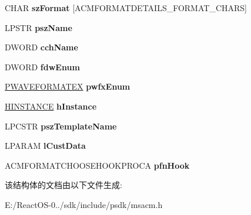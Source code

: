 \begin{DoxyCompactItemize}
\item 
\mbox{\label{struct___a_c_m_f_o_r_m_a_t_c_h_o_o_s_e_a_aa12541afbdb2ce4ba2170921fbbb7c5f}} 
C\+H\+AR {\bfseries sz\+Format} \mbox{[}A\+C\+M\+F\+O\+R\+M\+A\+T\+D\+E\+T\+A\+I\+L\+S\+\_\+\+F\+O\+R\+M\+A\+T\+\_\+\+C\+H\+A\+RS\mbox{]}
\item 
\mbox{\label{struct___a_c_m_f_o_r_m_a_t_c_h_o_o_s_e_a_a413c774e03db9ddd96c7baf54e897425}} 
L\+P\+S\+TR {\bfseries psz\+Name}
\item 
\mbox{\label{struct___a_c_m_f_o_r_m_a_t_c_h_o_o_s_e_a_a2a01ecd4c89bd2b08129a4c9c00c91ac}} 
D\+W\+O\+RD {\bfseries cch\+Name}
\item 
\mbox{\label{struct___a_c_m_f_o_r_m_a_t_c_h_o_o_s_e_a_aa82ee8884256f606da432f2aa06a5779}} 
D\+W\+O\+RD {\bfseries fdw\+Enum}
\item 
\mbox{\label{struct___a_c_m_f_o_r_m_a_t_c_h_o_o_s_e_a_a754fb60042efdbc527571146f68d3afb}} 
\hyperlink{struct___w_a_v_e_f_o_r_m_a_t_e_x}{P\+W\+A\+V\+E\+F\+O\+R\+M\+A\+T\+EX} {\bfseries pwfx\+Enum}
\item 
\mbox{\label{struct___a_c_m_f_o_r_m_a_t_c_h_o_o_s_e_a_a0fd60620a53ba2e738e99b49fa3f7f32}} 
\hyperlink{interfacevoid}{H\+I\+N\+S\+T\+A\+N\+CE} {\bfseries h\+Instance}
\item 
\mbox{\label{struct___a_c_m_f_o_r_m_a_t_c_h_o_o_s_e_a_a57d8dae1e0bf242f1dcc72e371a3e5e8}} 
L\+P\+C\+S\+TR {\bfseries psz\+Template\+Name}
\item 
\mbox{\label{struct___a_c_m_f_o_r_m_a_t_c_h_o_o_s_e_a_ab8322f8a8e9e24a9fd0f6c7cda7333df}} 
L\+P\+A\+R\+AM {\bfseries l\+Cust\+Data}
\item 
\mbox{\label{struct___a_c_m_f_o_r_m_a_t_c_h_o_o_s_e_a_ac6a10b00e641dcb09f32f3356cfd8d99}} 
A\+C\+M\+F\+O\+R\+M\+A\+T\+C\+H\+O\+O\+S\+E\+H\+O\+O\+K\+P\+R\+O\+CA {\bfseries pfn\+Hook}
\end{DoxyCompactItemize}


该结构体的文档由以下文件生成\+:\begin{DoxyCompactItemize}
\item 
E\+:/\+React\+O\+S-\/0../sdk/include/psdk/msacm.\+h\end{DoxyCompactItemize}
